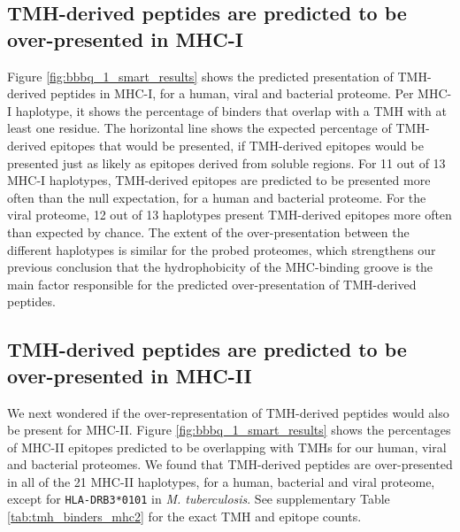\subsection{TMH-derived peptides are predicted to be over-presented in MHC-I}

Figure \ref{fig:bbbq_1_smart_results} shows the predicted presentation of TMH-derived peptides in MHC-I,
for a human, viral and bacterial proteome.
Per MHC-I haplotype, it shows the percentage of binders that overlap with a TMH 
with at least one residue.
The horizontal line shows the expected percentage of TMH-derived epitopes 
that would be presented, if TMH-derived epitopes would be presented just as 
likely as epitopes derived from soluble regions.
For 11 out of 13 MHC-I haplotypes, TMH-derived epitopes are predicted to be presented more often 
than the null expectation, for a human and bacterial proteome.
For the viral proteome, 12 out of 13 haplotypes present
TMH-derived epitopes more often than expected by chance.
The extent of the over-presentation between the different haplotypes 
is similar for the probed proteomes, 
which strengthens our previous conclusion \cite{bianchi2017} 
that the hydrophobicity of the MHC-binding groove 
is the main factor responsible for the predicted over-presentation 
of TMH-derived peptides.



\subsection{TMH-derived peptides are predicted to be over-presented in MHC-II}

We next wondered if the over-representation of TMH-derived peptides 
would also be present for MHC-II. 
Figure \ref{fig:bbbq_1_smart_results} shows the percentages of MHC-II epitopes 
predicted to be overlapping with TMHs for our human, viral and bacterial proteomes.
We found that TMH-derived peptides are over-presented in all
of the 21 MHC-II haplotypes, 
for a human, bacterial and viral proteome,
except for \verb;HLA-DRB3*0101; in \emph{M. tuberculosis}.
See supplementary Table \ref{tab:tmh_binders_mhc2} 
for the exact TMH and epitope counts.


